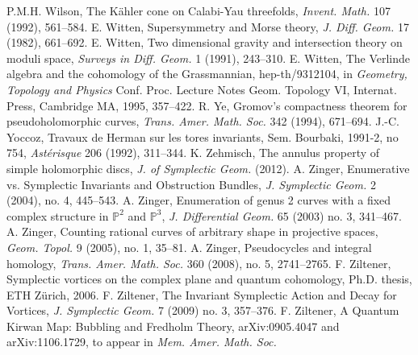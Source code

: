  P.M.H. Wilson, The Kähler cone on Calabi-Yau threefolds, \emph{Invent. Math.} 107 (1992), 561--584.
 E. Witten, Supersymmetry and Morse theory, \emph{J. Diff. Geom.} 17 (1982), 661--692.
 E. Witten, Two dimensional gravity and intersection theory on moduli space, \emph{Surveys in Diff. Geom.} 1 (1991), 243--310.
 E. Witten, The Verlinde algebra and the cohomology of the Grassmannian, hep-th/9312104, in \emph{Geometry, Topology and Physics} Conf. Proc. Lecture Notes Geom. Topology VI, Internat. Press, Cambridge MA, 1995, 357--422.
 R. Ye, Gromov’s compactness theorem for pseudoholomorphic curves, \emph{Trans. Amer. Math. Soc.} 342 (1994), 671--694.
 J.-C. Yoccoz, Travaux de Herman sur les tores invariants, Sem. Bourbaki, 1991-2, no 754, \emph{Astérisque} 206 (1992), 311--344.
 K. Zehmisch, The annulus property of simple holomorphic discs, \emph{J. of Symplectic Geom.} (2012).
 A. Zinger, Enumerative vs. Symplectic Invariants and Obstruction Bundles, \emph{J. Symplectic Geom.} 2 (2004), no. 4, 445--543.
 A. Zinger, Enumeration of genus 2 curves with a fixed complex structure in $\mathbb P^2$ and $\mathbb P^3$, \emph{J. Differential Geom.} 65 (2003) no. 3, 341--467.
 A. Zinger, Counting rational curves of arbitrary shape in projective spaces, \emph{Geom. Topol.} 9 (2005), no. 1, 35--81.
 A. Zinger, Pseudocycles and integral homology, \emph{Trans. Amer. Math. Soc.} 360 (2008), no. 5, 2741--2765.
 F. Ziltener, Symplectic vortices on the complex plane and quantum cohomology, Ph.D. thesis, ETH Zürich, 2006.
 F. Ziltener, The Invariant Symplectic Action and Decay for Vortices, \emph{J. Symplectic Geom.} 7 (2009) no. 3, 357--376.
 F. Ziltener, A Quantum Kirwan Map: Bubbling and Fredholm Theory, arXiv:0905.4047 and arXiv:1106.1729, to appear in \emph{Mem. Amer. Math. Soc.}
